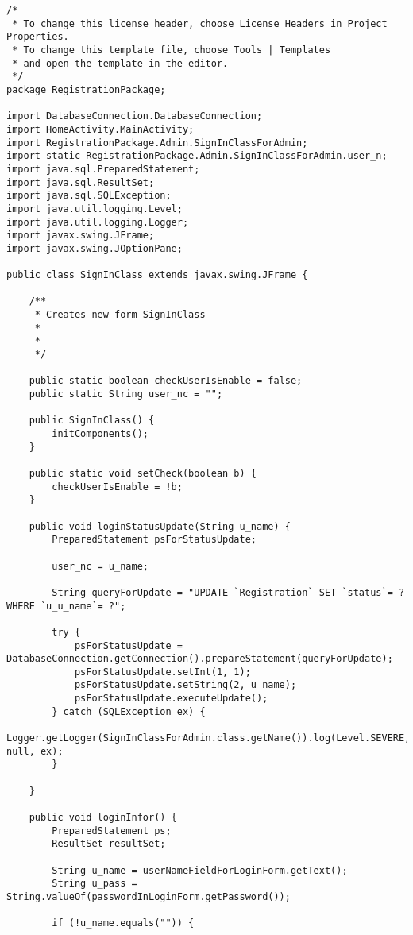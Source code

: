 \documentclass[12pt,a4paper]{article}
\begin{document}
	\begin{lstlisting}
/*
 * To change this license header, choose License Headers in Project Properties.
 * To change this template file, choose Tools | Templates
 * and open the template in the editor.
 */
package RegistrationPackage;

import DatabaseConnection.DatabaseConnection;
import HomeActivity.MainActivity;
import RegistrationPackage.Admin.SignInClassForAdmin;
import static RegistrationPackage.Admin.SignInClassForAdmin.user_n;
import java.sql.PreparedStatement;
import java.sql.ResultSet;
import java.sql.SQLException;
import java.util.logging.Level;
import java.util.logging.Logger;
import javax.swing.JFrame;
import javax.swing.JOptionPane;

public class SignInClass extends javax.swing.JFrame {

    /**
     * Creates new form SignInClass
     * 
     * 
     */
    
    public static boolean checkUserIsEnable = false;
    public static String user_nc = "";
    
    public SignInClass() {
        initComponents();
    }
    
    public static void setCheck(boolean b) {
        checkUserIsEnable = !b;
    }
    
    public void loginStatusUpdate(String u_name) {
        PreparedStatement psForStatusUpdate;
        
        user_nc = u_name;
        
        String queryForUpdate = "UPDATE `Registration` SET `status`= ? WHERE `u_u_name`= ?";
        
        try {
            psForStatusUpdate = DatabaseConnection.getConnection().prepareStatement(queryForUpdate);
            psForStatusUpdate.setInt(1, 1);
            psForStatusUpdate.setString(2, u_name);
            psForStatusUpdate.executeUpdate();
        } catch (SQLException ex) {
            Logger.getLogger(SignInClassForAdmin.class.getName()).log(Level.SEVERE, null, ex);
        }
               
    }
    
    public void loginInfor() {
        PreparedStatement ps;
        ResultSet resultSet;

        String u_name = userNameFieldForLoginForm.getText();
        String u_pass = String.valueOf(passwordInLoginForm.getPassword());

        if (!u_name.equals("")) {


\end{lstlisting}
\end{document}
